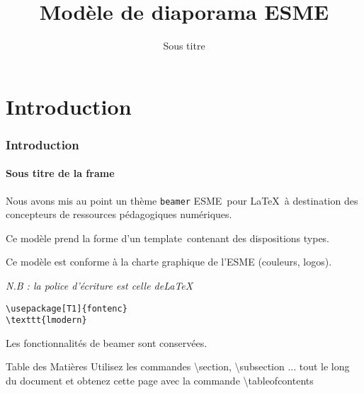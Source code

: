 \documentclass[aspectratio=169]{beamer}
\title{Modèle de diaporama ESME}
\subtitle{Sous titre}
\date[]{}
\author[]{}
\begin{document}
\begin{frame}
\titlepage
\end{frame}

\section{Introduction}

\begin{frame}[fragile] 
\frametitle{Introduction} 
\framesubtitle{Sous titre de la frame} 

Nous avons mis au point un thème \texttt{beamer} \og ESME\fg~pour 
\LaTeX~à destination des concepteurs de ressources pédagogiques 
numériques.\newline

Ce modèle prend la forme d'un \og template\fg~contenant des 
dispositions types.\newline

Ce modèle est conforme à la charte graphique de l'ESME (couleurs, 
logos).

\emph{N.B : la police d'écriture est celle de\LaTeX}\newline

\begin{verbatim}
\usepackage[T1]{fontenc}
\texttt{lmodern}
\end{verbatim}

Les fonctionnalités de beamer sont conservées.
\end{frame}

\begin{frame}{Table des Matières}
    \tableofcontents
    \scriptsize
    Utilisez les commandes \textbackslash section, \textbackslash subsection ...
    tout le long du document et obtenez cette page avec la commande 
    \textbackslash tableofcontents
\end{frame}
\end{document}
